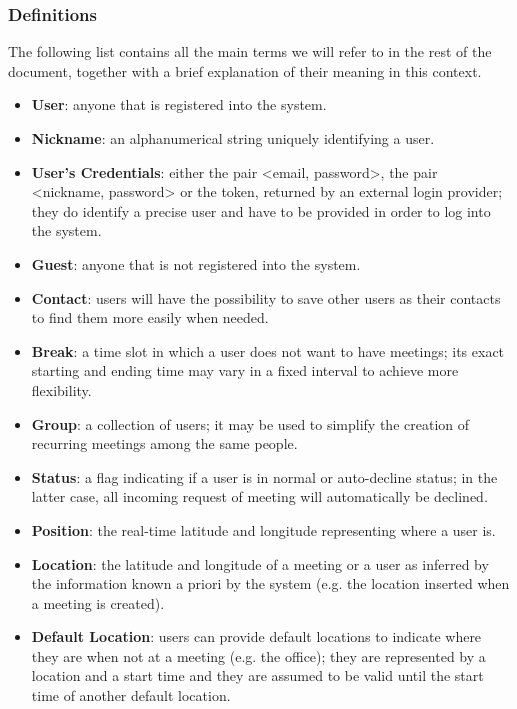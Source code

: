 \subsubsection{Definitions}

The following list contains all the main terms we will refer to in the rest of the document, together with a brief explanation of their meaning in this context.

\begin{itemize}
\item \textbf{User}: anyone that is registered into the system.
\item \textbf{Nickname}: an alphanumerical string uniquely identifying a user.
\item \textbf{User’s Credentials}: either the pair <email, password>, the pair <nickname, password> or the token, returned by an external login provider; they do identify a precise user and have to be provided in order to log into the system.
\item \textbf{Guest}: anyone that is not registered into the system.
\item \textbf{Contact}: users will have the possibility to save other users as their contacts to find them more easily when needed.
\item \textbf{Break}: a time slot in which a user does not want to have meetings; its exact starting and ending time may vary in a fixed interval to achieve more flexibility.
\item \textbf{Group}: a collection of users; it may be used to simplify the creation of recurring meetings among the same people.
\item \textbf{Status}: a flag indicating if a user is in normal or auto-decline status; in the latter case, all incoming request of meeting will automatically be declined.

\item \textbf{Position}: the real-time latitude and longitude representing where a user is.
\item \textbf{Location}: the latitude and longitude of a meeting or a user as inferred by the information known a priori by the system (e.g. the location inserted when a meeting is created).
\item \textbf{Default Location}: users can provide default locations to indicate where they are when not at a meeting (e.g. the office); they are represented by a location and a start time and they are assumed to be valid until the start time of another default location.


\end{itemize}
